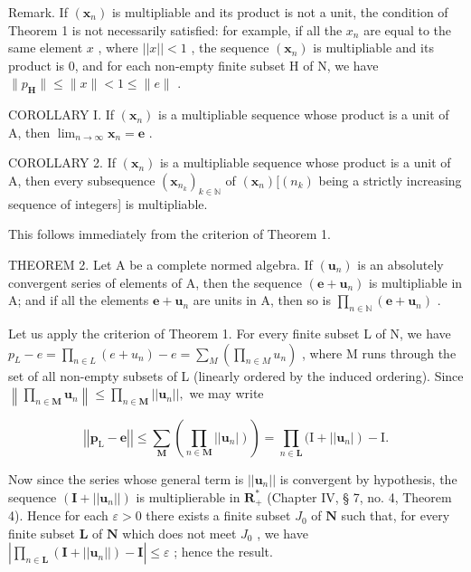 Remark. If \((\pmb{x}_n)\) is multipliable and its product is not a unit, the condition of Theorem 1 is not necessarily satisfied: for example, if all the \(x_n\) are equal to the same element \(x\) , where \(||x|| < 1\) , the sequence \((\pmb{x}_n)\) is multipliable and its product is 0, and for each non-empty finite subset H of N, we have \(\| p_{\mathbf{H}} \| \leqslant \| x \| < 1 \leqslant \| e \|\) .

COROLLARY I. If \((\pmb{x}_n)\) is a multipliable sequence whose product is a unit of A, then \(\lim_{n\to \infty}\pmb{x}_n = \pmb{e}\) .

COROLLARY 2. If \((\pmb{x}_n)\) is a multipliable sequence whose product is a unit of A, then every subsequence \((\pmb{x}_{n_k})_{k\in \mathbb{N}}\) of \((\pmb{x}_n)[(n_k)\) being a strictly increasing sequence of integers{]} is multipliable.

This follows immediately from the criterion of Theorem 1.

THEOREM 2. Let A be a complete normed algebra. If \((\pmb{u}_n)\) is an absolutely convergent series of elements of A, then the sequence \((\pmb{e} + \pmb{u}_n)\) is multipliable in A; and if all the elements \(\pmb{e} + \pmb{u}_n\) are units in A, then so is \(\prod_{n\in \mathbb{N}}(\pmb {e} + \pmb{u}_n)\) .

Let us apply the criterion of Theorem 1. For every finite subset L of N, we have \(p_{L} - e = \prod_{n \in L} (e + u_n) - e = \sum_{M} \left( \prod_{n \in M} u_n \right)\) , where M runs through the set of all non-empty subsets of L (linearly ordered by the induced ordering). Since \(\left\| \prod_{n\in \mathbf{M}}\pmb {u}_n\right\| \leqslant \prod_{n\in \mathbf{M}}||\pmb {u}_n||,\) we may write

\[
\left| \left| \boldsymbol {p} _ {\mathrm{L}} - \boldsymbol {e} \right| \right| \leqslant \sum_ {\mathbf {M}} \left(\prod_ {n \in \mathbf {M}} \left| \left| \boldsymbol {u} _ {n} \right|\right)\right) = \prod_ {n \in \mathbf {L}} (\mathrm{I} + \left| \left| \boldsymbol {u} _ {n} \right|\right) - \mathrm{I}.
\]

Now since the series whose general term is \(||\boldsymbol{u}_n||\) is convergent by hypothesis, the sequence \((\mathbf{I} + ||\boldsymbol{u}_n||)\) is multiplierable in \(\mathbf{R}_+^*\) (Chapter IV, § 7, no. 4, Theorem 4). Hence for each \(\varepsilon > 0\) there exists a finite subset \(J_0\) of \(\mathbf{N}\) such that, for every finite subset \(\mathbf{L}\) of \(\mathbf{N}\) which does not meet \(J_0\) , we have \(\left| \prod_{n \in \mathbf{L}} (\mathbf{I} + ||\boldsymbol{u}_n||) - \mathbf{I} \right| \leqslant \varepsilon\) ; hence the result.

